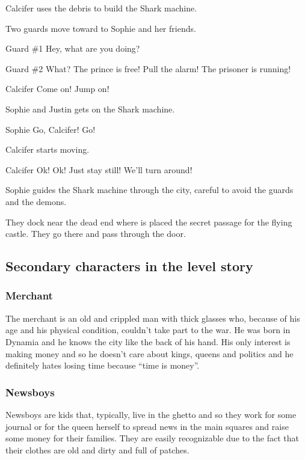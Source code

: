 Calcifer uses the debris to build the Shark machine.

\begin{screenplay}

Two guards move toward to Sophie and her friends.

\begin{dialogue}{Guard \#{}1}
Hey, what are you doing?
\end{dialogue}

\begin{dialogue}[screaming]{Guard \#{}2}
What? The prince is free! Pull the alarm! The prisoner is running!
\end{dialogue}

\begin{dialogue}[worried]{Calcifer}
Come on! Jump on!
\end{dialogue}

Sophie and Justin gets on the Shark machine.

\begin{dialogue}[in a hurry]{Sophie}
Go, Calcifer! Go!
\end{dialogue}

Calcifer starts moving.

\begin{dialogue}[worried]{Calcifer}
Ok! Ok! Just stay still! We'll turn around!
\end{dialogue}

\end{screenplay}
\vspace{1em}

Sophie guides the Shark machine through the city, careful to avoid the guards and the demons.

They dock near the dead end where is placed the secret passage for the flying castle. They go there and pass through the door.

\subsection{Secondary characters in the level story}
\subsubsection*{Merchant}
The merchant is an old and crippled man with thick glasses who, because of his age and his physical condition, couldn't take part to the war. He was born in Dynamia and he knows the city like the back of his hand. His only interest is making money and so he doesn't care about kings, queens and politics and he definitely hates losing time because \enquote{time is money}.

\subsubsection*{Newsboys}
Newsboys are kids that, typically, live in the ghetto and so they work for some journal or for the queen herself to spread news in the main squares and raise some money for their families. They are easily recognizable due to the fact that their clothes are old and dirty and full of patches.
